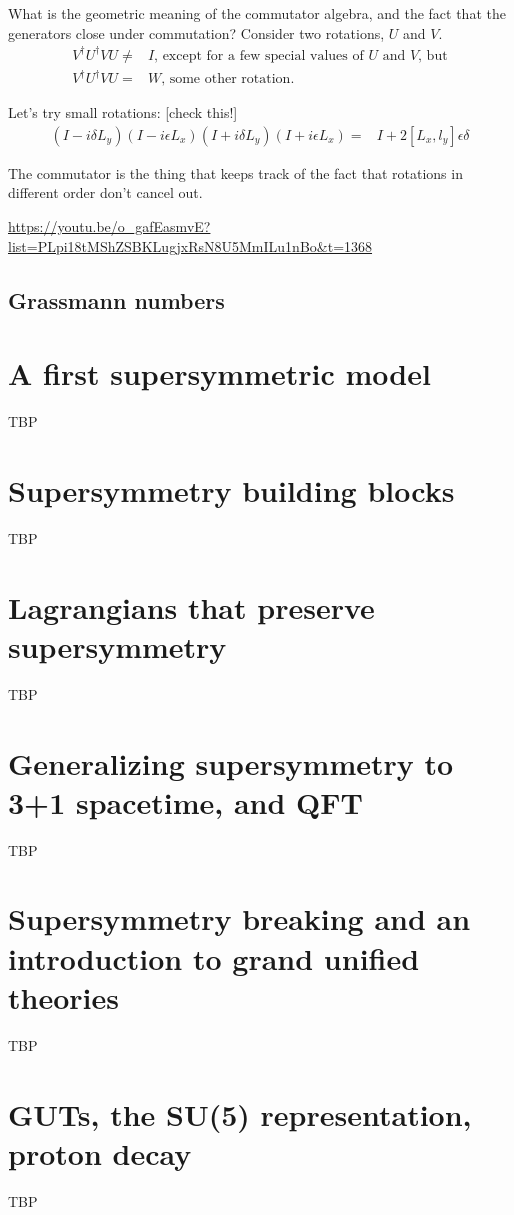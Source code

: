 \documentclass[]{article}
\begin{document}
What is the geometric meaning of the commutator algebra, and the fact that the generators close under commutation? Consider two rotations, $U$ and $V$.
\begin{align*}
	V^\dagger U^\dagger VU \ne& I \text{, except for a few special values of $U$ and $V$, but}\\
	V^\dagger U^\dagger VU =& W \text{, some other rotation.}
\end{align*}

Let's try small rotations: [check this!]
\begin{align*}
	(I-i\delta L_y) (I-i\epsilon L_x) (I+i\delta L_y) (I+i\epsilon L_x) =& I + 2[L_x,l_y]\epsilon\delta
\end{align*}

The commutator is the thing that keeps track of the fact that rotations in different order don't cancel out.

\url{https://youtu.be/o_gafEasmvE?list=PLpi18tMShZSBKLugjxRsN8U5MmILu1nBo&t=1368}


\subsection{Grassmann numbers}

\section{A first supersymmetric model}

TBP

\section{Supersymmetry building blocks}

TBP

\section{Lagrangians that preserve supersymmetry}

TBP

\section{Generalizing supersymmetry to 3+1 spacetime, and QFT}

TBP

\section{Supersymmetry breaking and an introduction to grand unified theories}

TBP

\section{GUTs, the SU(5) representation, proton decay}

TBP



\raggedright

\end{document}
